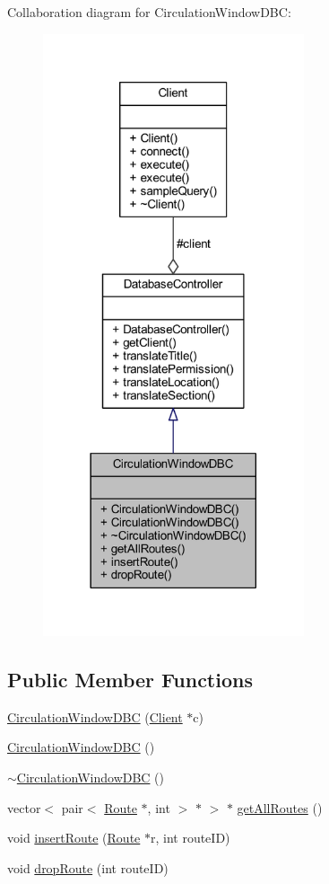 Collaboration diagram for Circulation\+Window\+D\+B\+C\+:
\nopagebreak
\begin{figure}[H]
\begin{center}
\leavevmode
\includegraphics[width=218pt]{class_circulation_window_d_b_c__coll__graph}
\end{center}
\end{figure}
\subsection*{Public Member Functions}
\begin{DoxyCompactItemize}
\item 
\hyperlink{class_circulation_window_d_b_c_aada1ae8b742429eb22b885aefe85c848}{Circulation\+Window\+D\+B\+C} (\hyperlink{class_client}{Client} $\ast$c)
\item 
\hyperlink{class_circulation_window_d_b_c_a607e1a068573f1e89d4ee85d3ab6759a}{Circulation\+Window\+D\+B\+C} ()
\item 
\hyperlink{class_circulation_window_d_b_c_a33d29275ba408466e171db99619477dd}{$\sim$\+Circulation\+Window\+D\+B\+C} ()
\item 
vector$<$ pair$<$ \hyperlink{class_route}{Route} $\ast$, int $>$ $\ast$ $>$ $\ast$ \hyperlink{class_circulation_window_d_b_c_a2d9fdc5b47f5f8b0a73264aed4f1e6fd}{get\+All\+Routes} ()
\item 
void \hyperlink{class_circulation_window_d_b_c_a4b2058d8836ab7293969a00c1a9d61bc}{insert\+Route} (\hyperlink{class_route}{Route} $\ast$r, int route\+I\+D)
\item 
void \hyperlink{class_circulation_window_d_b_c_a4c6dcb10809438c108e5ed26a5f08680}{drop\+Route} (int route\+I\+D)
\end{DoxyCompactItemize}
